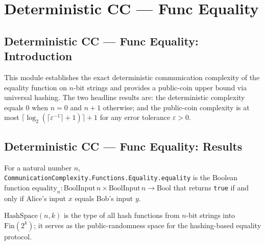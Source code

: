 \section{Deterministic CC --- Func Equality}
\subsection*{Deterministic CC --- Func Equality: Introduction}

This module establishes the exact deterministic communication complexity of the
equality function on $n$-bit strings and provides a public-coin upper bound via
universal hashing.  The two headline results are: the deterministic complexity
equals $0$ when $n = 0$ and $n + 1$ otherwise; and the public-coin complexity is
at most $\lceil \log_2(\lceil \varepsilon^{-1} \rceil + 1)\rceil + 1$ for any
error tolerance $\varepsilon > 0$.

\subsection*{Deterministic CC --- Func Equality: Results}

\begin{definition}
\label{CommunicationComplexity.Functions.Equality.equality}
\leanok
{}
For a natural number $n$, \texttt{CommunicationComplexity.Functions.Equality.equality}
is the Boolean function
$\mathrm{equality}_n : \mathrm{BoolInput}\,n \times \mathrm{BoolInput}\,n \to \mathrm{Bool}$
that returns \texttt{true} if and only if Alice's input $x$ equals Bob's input $y$.
\end{definition}

\begin{definition}
\label{CommunicationComplexity.Functions.Equality.HashSpace}
\leanok
{}
$\mathrm{HashSpace}(n, k)$ is the type of all hash functions from $n$-bit strings
into $\mathrm{Fin}(2^k)$; it serves as the public-randomness space for the
hashing-based equality protocol.
\end{definition}

